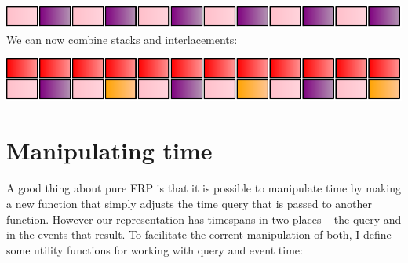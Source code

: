 \includegraphics{../figures/fig2.pdf}\\

We can now combine stacks and interlacements:

\begin{Shaded}
\begin{Highlighting}[]
\OtherTok{=}\NormalTok{ stack [atom red,}
\NormalTok{             ]}
\end{Highlighting}
\end{Shaded}

\includegraphics{../figures/fig3.pdf}\\

\section{Manipulating time}\label{manipulating-time}

A good thing about pure FRP is that it is possible to manipulate time by
making a new function that simply adjusts the time query that is passed
to another function. However our representation has timespans in two
places -- the query and in the events that result. To facilitate the
corrent manipulation of both, I define some utility functions for
working with query and event time:

